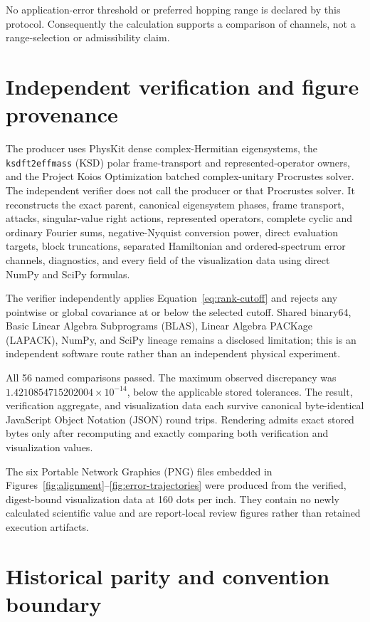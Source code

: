 \documentclass[11pt]{article}
\newcommand{\code}[1]{\texttt{#1}}
\begin{document}
No application-error threshold or preferred hopping range is declared by this protocol.
Consequently the calculation supports a comparison of channels, not a range-selection
or admissibility claim.

\FloatBarrier
\section{Independent verification and figure provenance}

The producer uses PhysKit dense complex-Hermitian eigensystems, the
\code{ksdft2effmass} (KSD) polar frame-transport and represented-operator owners, and
the Project Koios Optimization batched
complex-unitary Procrustes solver.  The independent verifier does not call the producer
or that Procrustes solver.  It reconstructs the exact parent, canonical eigensystem
phases, frame transport, attacks, singular-value right actions, represented operators,
complete cyclic and ordinary Fourier sums, negative-Nyquist conversion power, direct
evaluation targets, block truncations, separated Hamiltonian and ordered-spectrum error
channels, diagnostics, and every field of the visualization data using direct
NumPy and SciPy formulas.

The verifier independently applies Equation~\eqref{eq:rank-cutoff} and rejects any
pointwise or global covariance at or below the selected cutoff.  Shared binary64, Basic Linear Algebra Subprograms (BLAS), Linear Algebra PACKage
(LAPACK), NumPy, and SciPy lineage remains a disclosed limitation; this is an
independent software route rather than an independent physical experiment.

All 56 named comparisons passed.  The maximum observed discrepancy was
$1.4210854715202004\times10^{-14}$, below the applicable stored tolerances.  The result,
verification aggregate, and visualization data each survive canonical byte-identical
JavaScript Object Notation (JSON) round trips. Rendering admits exact stored bytes only
after recomputing and exactly comparing both verification and visualization values.

The six Portable Network Graphics (PNG) files embedded in
Figures~\ref{fig:alignment}--\ref{fig:error-trajectories} were produced from the
verified, digest-bound visualization data at 160 dots per inch. They contain no newly
calculated scientific value and are report-local review figures rather than retained
execution artifacts.

\section{Historical parity and convention boundary}
\end{document}
